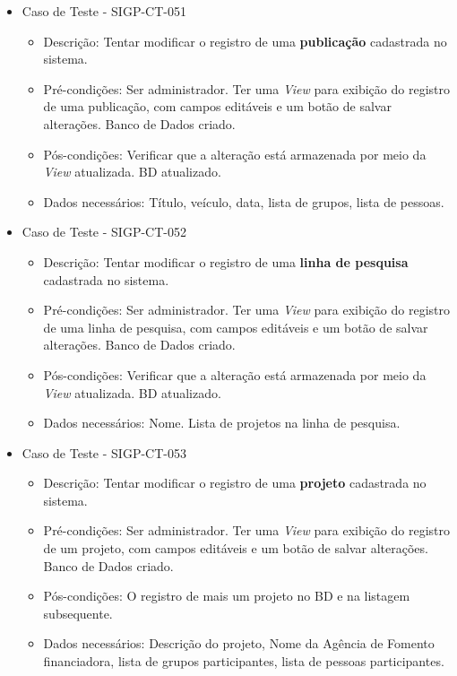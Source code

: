 \documentclass[11pt, a4paper]{book}
\begin{document}
\begin{itemize}
	\item Caso de Teste - SIGP-CT-051
	\begin{itemize}
	\item Descrição: Tentar modificar o registro de uma \textbf{publicação} cadastrada no sistema.
\item Pré-condições: Ser administrador. Ter uma \emph{View} para exibição do registro de uma publicação, com campos editáveis e um botão de salvar alterações. Banco de Dados criado.
	\item Pós-condições:  Verificar que a alteração está armazenada por meio da \emph{View} atualizada. BD atualizado.
	\item Dados necessários: Título, veículo, data, lista de grupos, lista de pessoas.
	\end{itemize}

	\item Caso de Teste - SIGP-CT-052
	\begin{itemize}
	\item Descrição: Tentar modificar o registro de uma \textbf{linha de pesquisa} cadastrada no sistema.
	\item Pré-condições: Ser administrador. Ter uma \emph{View} para exibição do registro de uma linha de pesquisa, com campos editáveis e um botão de salvar alterações. Banco de Dados criado.
	\item Pós-condições:  Verificar que a alteração está armazenada por meio da \emph{View} atualizada. BD atualizado.
	\item Dados necessários: Nome. Lista de projetos na linha de pesquisa.
	\end{itemize}

	\item Caso de Teste - SIGP-CT-053
	\begin{itemize}
	\item Descrição:  Tentar modificar o registro de uma \textbf{projeto} cadastrada no sistema.
\item Pré-condições: Ser administrador. Ter uma \emph{View} para exibição do registro de um projeto, com campos editáveis e um botão de salvar alterações. Banco de Dados criado.
	\item Pós-condições: O registro de mais um projeto no BD e na listagem subsequente.
	\item Dados necessários: Descrição do projeto, Nome da Agência de Fomento financiadora, lista de grupos participantes, lista de pessoas participantes.
	\end{itemize}



\end{itemize}
\end{document}

